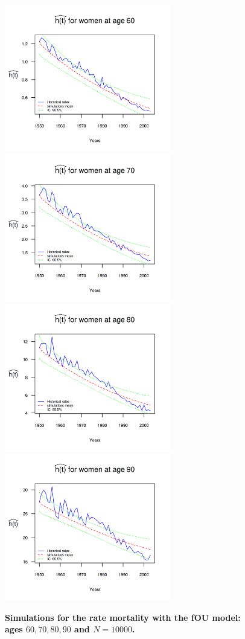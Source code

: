 \documentclass[12pt,reqno]{amsart}
\theoremstyle{definition}
\theoremstyle{remark}
\numberwithin{equation}{section}
\begin{document}
\begin{figure}[H]
\includegraphics[width = 2.85in]{PlotWomen60.png}
\includegraphics[width = 2.85in]{PlotWomen70.png}
\includegraphics[width = 2.85in]{PlotWomen80.png}
\includegraphics[width = 2.85in]{PlotWomen90.png}
\caption{\bf Simulations for the rate mortality with the fOU model: ages $60,70,80,90$ and $N=10000$.}
\label{graph-simu_FOU2}
\end{figure}\vspace*{0.1cm}
\end{document}
